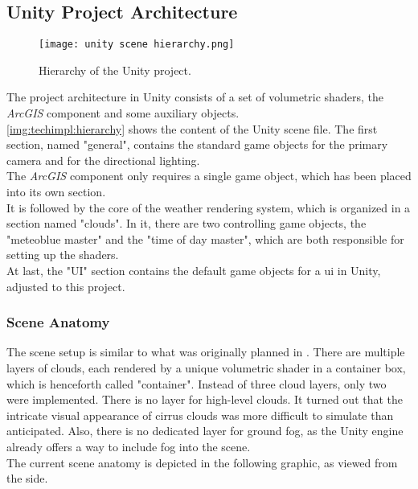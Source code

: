 \subsection{Unity Project Architecture}
\begin{wrapfigure}[13]{r}{4cm}
    \vspace{-\baselineskip}
    \texttt{[image: unity scene hierarchy.png]}
    \caption{Hierarchy of the Unity project.}
    \label{img:techimpl:hierarchy}
\end{wrapfigure}
The project architecture in Unity consists of a set of \gls{volumetric} \gls{shader}s, the \emph{ArcGIS} component and some auxiliary objects.
\\
\autoref{img:techimpl:hierarchy} shows the content of the Unity scene file.
The first section, named "general", contains the standard game objects for the primary camera and for the directional lighting.
\\
The \emph{ArcGIS} component only requires a single game object, which has been placed into its own section.
\\
It is followed by the core of the weather rendering system, which is organized in a section named "clouds".
In it, there are two controlling game objects, the "meteoblue master" and the "time of day master", which are both responsible for setting up the shaders.
\\
At last, the "UI" section contains the default game objects for a \gls{ui} in Unity, adjusted to this project.

\clearpage

\subsubsection{Scene Anatomy}
The scene setup is similar to what was originally planned in . There are multiple layers of clouds, each rendered by a unique \gls{volumetric} \gls{shader}
in a container box, which is henceforth called "container".
Instead of three cloud layers, only two were implemented. There is no layer for high-level clouds. It turned out that the intricate visual appearance of cirrus clouds was more difficult to simulate than anticipated.
Also, there is no dedicated layer for ground fog, as the Unity engine already offers a way to include fog into the scene.
\\
The current scene anatomy is depicted in the following graphic, as viewed from the side.

